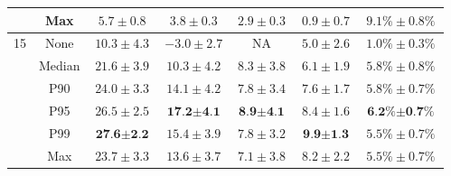 \begin{table}[h]
\begin{center}
{\begin{tabular}{ccccccc}
& Max & $5.7 \pm 0.8$& $3.8 \pm 0.3$& $2.9 \pm 0.3$& $0.9 \pm 0.7$& $9.1\% \pm 0.8\%$ \\
\midrule
15 & None & $10.3 \pm 4.3$& $-3.0 \pm 2.7$& NA & $5.0 \pm 2.6$& $1.0\% \pm 0.3\%$ \\
& Median & $21.6 \pm 3.9$& $10.3 \pm 4.2$& $8.3 \pm 3.8$& $6.1 \pm 1.9$& $5.8\% \pm 0.8\%$ \\
& P90 & $24.0 \pm 3.3$& $14.1 \pm 4.2$& $7.8 \pm 3.4$& $7.6 \pm 1.7$& $5.8\% \pm 0.7\%$ \\
& P95 & $26.5 \pm 2.5$& $\textbf{17.2} \pm \textbf{4.1}$& $\textbf{8.9} \pm \textbf{4.1}$& $8.4 \pm 1.6$& $\textbf{6.2\%} \pm \textbf{0.7\%}$ \\
& P99 & $\textbf{27.6} \pm \textbf{2.2}$& $15.4 \pm 3.9$& $7.8 \pm 3.2$& $\textbf{9.9} \pm \textbf{1.3}$& $5.5\% \pm 0.7\%$ \\
& Max & $23.7 \pm 3.3$& $13.6 \pm 3.7$& $7.1 \pm 3.8$& $8.2 \pm 2.2$& $5.5\% \pm 0.7\%$ \\
\bottomrule
\end{tabular}
}
\label{Appendix_D_Table_CVAE_BO_threshold_analysis}
\end{center}
\end{table}